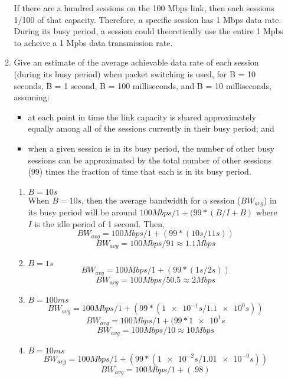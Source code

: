 \documentclass[10pt]{amsart}
\begin{document}
\begin{enumerate}
\begin{enumerate}
            If there are a hundred sessions on the 100 Mbps link, then each
            sessions 1/100 of that capacity.  Therefore, a specific session has
            1 Mbps data rate.  During its busy period, a session could
            theoretically use the entire 1 Mpbs to acheive a 1 Mpbs data
            transmission rate.
        \item Give an estimate of the average achievable data rate of each
            session (during its busy period) when packet switching is used, for
            B = 10 seconds, B = 1 second, B = 100 milliseconds, and B = 10
            milliseconds, assuming:
        \begin{itemize}
            \item at each point in time the link capacity is shared approximately
                equally among all of the sessions currently in their busy period; and
            \item when a given session is in its busy period, the number of other busy
                sessions can be approximated by the total number of other sessions (99)
                times the fraction of time that each is in its busy period.
        \end{itemize}
        \begin{enumerate}
            \item $B = 10s$\\
                When $B = 10s$, then the average bandwidth for a session
                ($BW_{avg}$) in its busy period will be around $100 Mbps / 1 +
                (99 * ( B / I + B )$ where $I$ is the idle period of 1 second.
                Then, \[ BW_{avg} = 100 Mbps / 1 + ( 99 * ( 10s / 11s)) \]
                      \[ BW_{avg} = 100 Mbps / 91 \approx 1.1 Mbps \]
            \item $B = 1s$\\
                \[ BW_{avg} = 100 Mbps / 1 + ( 99 * ( 1s / 2s)) \]
                \[ BW_{avg} = 100 Mbps / 50.5 \approx 2 Mbps \]
            \item $B = 100ms$\\
                \[ BW_{avg} = 100 Mbps / 1 + ( 99 * ( \num{1e-1}s / \num{1.1e0}s)) \]
                \[ BW_{avg} = 100 Mbps / 1 + ( 99 * \num{1e1}s\]
                \[ BW_{avg} = 100 Mbps / 10 \approx 10 Mbps \]
            \item $B = 10ms$\\
                \[ BW_{avg} = 100 Mbps / 1 + ( 99 * ( \num{1e-2}s / \num{1.01e-0}s)) \]
                \[ BW_{avg} = 100 Mbps / 1 + ( .98) \]

\end{enumerate}
\end{enumerate}
\end{enumerate}
\end{document}
